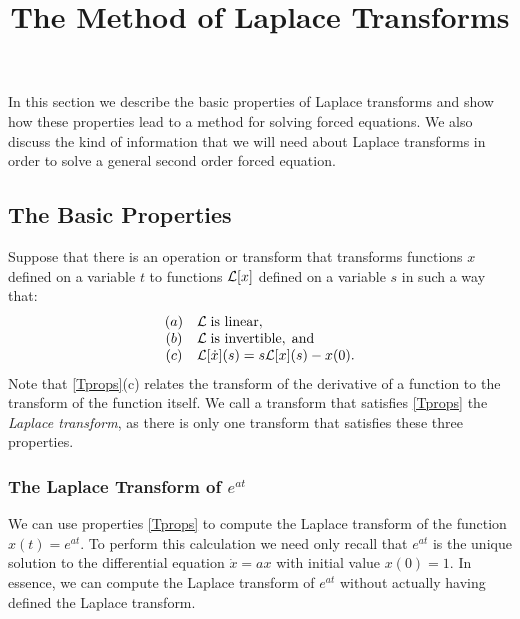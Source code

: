 \documentclass{ximera}
\title{The Method of Laplace Transforms}
\begin{document}
\begin{abstract}
\end{abstract}
\maketitle

 \label{S:13.1}

In this section we describe the basic properties of Laplace transforms and 
show how these properties lead to a method for solving forced equations.   
We also discuss the kind of information that we will need about Laplace 
transforms in order to solve a general second order forced equation. 

\subsection*{The Basic Properties}

Suppose that there is an operation or transform that transforms functions $x$ 
defined on a variable $t$ to functions ${\cal L}[x]$ defined on a variable 
$s$ in such a way that:
\begin{equation}  \label{Tprops}
\begin{array}{cl}
(a) & {\cal L}\; \mbox{is linear},\\
(b) & {\cal L}\; \mbox{is invertible},\; \mbox{and}\\
(c) & {\cal L}[\dot{x}](s) = s{\cal L}[x](s) - x(0).
\end{array}
\end{equation}
Note that \eqref{Tprops}(c) relates the transform of the derivative of a 
function to the transform of the function itself.  We call a transform that 
satisfies \eqref{Tprops} the {\em Laplace transform\/}, as there is only one 
transform that satisfies these three properties.

\subsubsection*{The Laplace Transform of $e^{at}$}

We can use properties \eqref{Tprops} to compute the Laplace transform of the
function $x(t) = e^{at}$.  To perform this calculation we need only recall 
that $e^{at}$ is the unique solution to the differential equation 
$\dot{x}=ax$ with initial value $x(0)=1$.  In essence, we can compute the 
Laplace transform of $e^{at}$ without actually having defined the Laplace 
transform.
\end{document}

